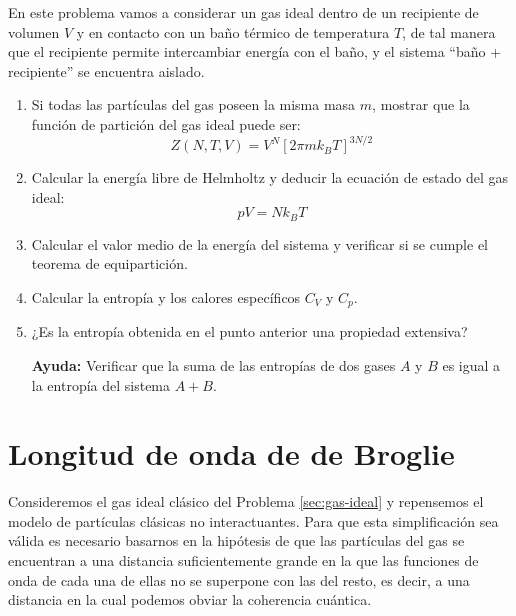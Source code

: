 \documentclass[a4paper,11pt]{article}
\begin{document}
En este problema vamos a considerar un gas ideal dentro de un
recipiente de volumen $V$ y en contacto con un baño térmico de
temperatura $T$, de tal manera que el recipiente permite intercambiar
energía con el baño, y el sistema ``baño + recipiente'' se encuentra
aislado.

\begin{enumerate}[label=(\alph*),
                  leftmargin=2\parindent,
                  rightmargin=2\parindent]

    \item{\label{item:gas-ideal-particion}
          Si todas las partículas del gas poseen la misma masa $m$,
          mostrar que la función de partición del gas ideal puede ser:
          $$ Z(N, T, V) = V^N \left[ 2\pi m k_B T \right]^{3N/2} $$
          }

    \item{Calcular la energía libre de Helmholtz y deducir la ecuación de
          estado del gas ideal:
          $$ pV = N k_B T $$
          }

    \item{Calcular el valor medio de la energía del sistema y
          verificar si se cumple el teorema de equipartición.
          }

    \item{Calcular la entropía y los calores específicos $C_V$ y $C_p$.
          }

    \item{¿Es la entropía obtenida en el punto anterior una propiedad
          extensiva?
          }

    {\small
    \textbf{Ayuda:} Verificar que la suma de las entropías de dos
    gases $A$ y $B$ es igual a la entropía del sistema $A + B$.
    }

\end{enumerate}


\section{Longitud de onda de de Broglie}
\label{sec:de-broglie}

Consideremos el gas ideal clásico del Problema \ref{sec:gas-ideal} y
repensemos el modelo de partículas clásicas no interactuantes. Para que esta
simplificación sea válida es necesario basarnos en la hipótesis de que las
partículas del gas se encuentran a una distancia suficientemente grande en la
que las funciones de onda de cada una de ellas no se superpone con las del
resto, es decir, a una distancia en la cual podemos obviar la coherencia
cuántica.
\end{document}
